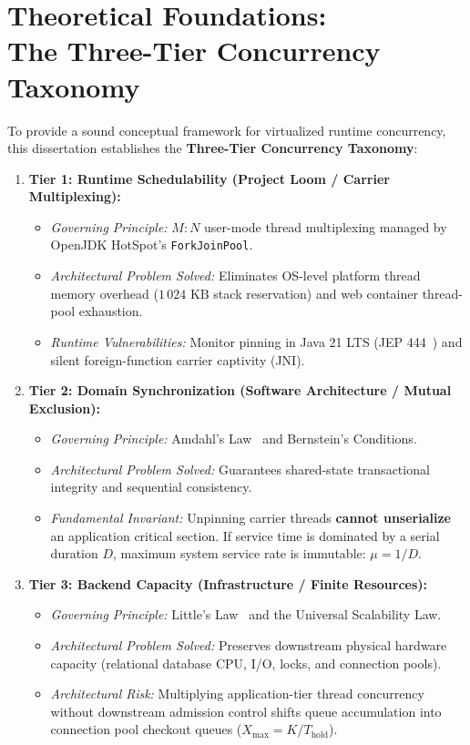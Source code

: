 \section[The Three-Tier Concurrency Taxonomy]{Theoretical Foundations:\\ The Three-Tier Concurrency Taxonomy}
\label{sec:three-tier-taxonomy}

To provide a sound conceptual framework for virtualized runtime concurrency, this dissertation establishes the \textbf{Three-Tier Concurrency Taxonomy}:

\begin{enumerate}
  \item \textbf{Tier 1: Runtime Schedulability (Project Loom / Carrier Multiplexing):}
    \begin{itemize}
      \item \emph{Governing Principle:} $M:N$ user-mode thread multiplexing managed by OpenJDK HotSpot's \texttt{ForkJoinPool}.
      \item \emph{Architectural Problem Solved:} Eliminates OS-level platform thread memory overhead ($1\,024\text{ KB}$ stack reservation) and web container thread-pool exhaustion.
      \item \emph{Runtime Vulnerabilities:} Monitor pinning in Java 21 LTS (JEP 444~\cite{JEP444}) and silent foreign-function carrier captivity (JNI).
    \end{itemize}
  \item \textbf{Tier 2: Domain Synchronization (Software Architecture / Mutual Exclusion):}
    \begin{itemize}
      \item \emph{Governing Principle:} Amdahl's Law~\cite{Amdahl1967} and Bernstein's Conditions.
      \item \emph{Architectural Problem Solved:} Guarantees shared-state transactional integrity and sequential consistency.
      \item \emph{Fundamental Invariant:} Unpinning carrier threads \textbf{cannot unserialize} an application critical section. If service time is dominated by a serial duration $D$, maximum system service rate is immutable: $\mu = 1/D$.
    \end{itemize}
  \item \textbf{Tier 3: Backend Capacity (Infrastructure / Finite Resources):}
    \begin{itemize}
      \item \emph{Governing Principle:} Little's Law~\cite{Little1961} and the Universal Scalability Law.
      \item \emph{Architectural Problem Solved:} Preserves downstream physical hardware capacity (relational database CPU, I/O, locks, and connection pools).
      \item \emph{Architectural Risk:} Multiplying application-tier thread concurrency without downstream admission control shifts queue accumulation into connection pool checkout queues ($X_{\text{max}} = K / T_{\text{hold}}$).
    \end{itemize}
\end{enumerate}

